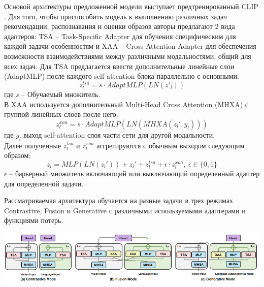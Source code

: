 \documentclass[a4paper,12pt]{article}
\begin{document}
				Основой архитектуры предложенной модели выступает предтренированный CLIP \cite{https://doi.org/10.48550/arXiv.2103.00020}. Для того, чтобы приспособить модель к выполнению различных задач рекомендации, распознавания и оценки образов авторы предлагают 2 вида адаптеров: TSA -- Task-Specific Adapter для обучения специфическим для каждой задачи особенностям и XAA -- Cross-Attention Adapter для обеспечения возможности взаимодействиями между различными модальностями, общий для всех задач. Для TSA предлагается ввести дополнительные линейные слои (AdaptMLP) после каждого self-attention блока параллельно с основными:
				$$z_l^{tsa}=s \cdot AdaptMLP(LN(z'_l))$$
				где $s$ -- Обучаемый множитель.\\
				В XAA используется дополнительный Multi-Head Cross Attention (MHXA) с группой линейных слоев после него:
				$$z_l^{xaa} = s\cdot AdaptMLP(LN(MHXA(z_l',y_l)))$$
				где $y_l$ выход self-attention слоя части сети для другой модальности.\\
				Далее полученные $z_l^{tsa}$ и $z_l^{xaa}$ аггрегируются с обычным выходом следующим образом:
				$$z_l = MLP(LN(z_l')) + z_l'+z_l^{tsa}+\epsilon\cdot z_l^{xaa},~\epsilon\in\{0,1\}$$
				$\epsilon$ -- барьерный множитель включающий или выключающий определенный адаптер для определенной задачи. 
				
				Рассматриваемая архитектура обучается на разные задачи в трех режимах Contrastive, Fusion и Generative с различными используемыми адаптерами и функциями потерь. 
				
				\includegraphics[scale = 0.7]{Literature review/FAME-ViL_modes.png}
				
\end{document}
